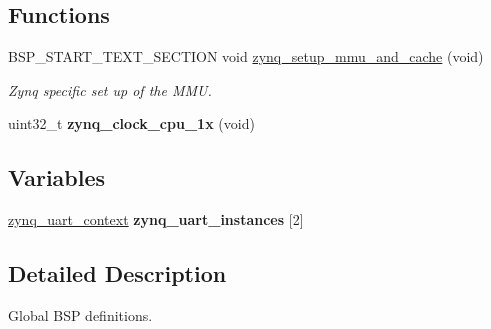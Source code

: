 \subsection*{Functions}
\begin{DoxyCompactItemize}
\item 
B\+S\+P\+\_\+\+S\+T\+A\+R\+T\+\_\+\+T\+E\+X\+T\+\_\+\+S\+E\+C\+T\+I\+ON void \mbox{\hyperlink{group__RTEMSBSPsARMZynq_ga6bf2b57b4e9ac66be0819f40f67c2145}{zynq\+\_\+setup\+\_\+mmu\+\_\+and\+\_\+cache}} (void)
\begin{DoxyCompactList}\small\item\em Zynq specific set up of the M\+MU. \end{DoxyCompactList}\item 
uint32\+\_\+t {\bfseries zynq\+\_\+clock\+\_\+cpu\+\_\+1x} (void)
\end{DoxyCompactItemize}
\subsection*{Variables}
\begin{DoxyCompactItemize}
\item 
\mbox{\hyperlink{structzynq__uart__context}{zynq\+\_\+uart\+\_\+context}} {\bfseries zynq\+\_\+uart\+\_\+instances} \mbox{[}2\mbox{]}
\end{DoxyCompactItemize}


\subsection{Detailed Description}
Global B\+SP definitions. 


